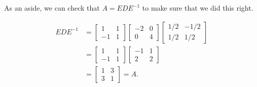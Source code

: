 \begin{exampleSol}
As an aside, we can check that $A = EDE^{-1}$ to make sure that we did this right.

\begin{equation*}
\begin{split}
EDE^{-1} &= \begin{bmatrix} 1 & 1 \\ -1 & 1 \end{bmatrix} \begin{bmatrix} -2 & 0 \\ 0 & 4 \end{bmatrix} \begin{bmatrix} 1/2 & -1/2 \\ 1/2 & 1/2 \end{bmatrix} \\
&= \begin{bmatrix} 1 & 1 \\ -1 & 1 \end{bmatrix} \begin{bmatrix} -1 & 1 \\ 2 & 2 \end{bmatrix} \\
&= \begin{bmatrix} 1 & 3 \\ 3 & 1 \end{bmatrix} = A.
\end{split}
\end{equation*}


\end{exampleSol}
